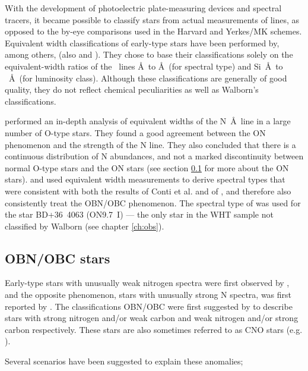 With the development of photoelectric plate-measuring devices and
spectral tracers, it became possible to classify stars from actual
measurements of lines, as opposed to the by-eye comparisons used in
the Harvard and Yerkes/MK schemes. Equivalent width classifications
of early-type stars have been performed by, among others,
 (also \cite{co:v} and \cite{co:vi}). They chose to base
their classifications solely on the equivalent-width ratios of the
\hei\ lines \AA\ to \AA\ (for spectral type) and
Si~\AA\ to
\hei~\AA\ (for luminosity class). Although these
classifications are generally of good quality, they do not reflect
chemical peculiarities as well as Walborn's classifications.

 performed an in-depth analysis of equivalent widths of
the N~\AA\ line in a large number of O-type stars. They
found a good agreement between the ON phenomenon and the strength of
the N line. They also concluded that there is a continuous
distribution of N abundances, and not a marked discontinuity between
normal O-type stars and the ON stars (see section \ref{sec:intro_obn}
for more about the ON stars).  and
 used equivalent width measurements to derive spectral
types that were consistent with both the results of Conti et al. and
of , and therefore also consistently treat the OBN/OBC
phenomenon. The spectral type of
 was used for the star BD+36~4063 (ON9.7~I) --- the only
star in the WHT sample not classified by Walborn (see chapter \ref{ch:obs}).

\subsection{OBN/OBC stars}
\label{sec:intro_obn}
Early-type stars with unusually weak nitrogen spectra were first observed by
, and the opposite phenomenon, stars with unusually strong
N spectra, was first reported by . The classifications
OBN/OBC were first suggested by  to describe stars with
strong nitrogen and/or weak carbon and weak nitrogen and/or strong
carbon respectively. These stars are also sometimes referred to as CNO
stars (e.g. \cite{jaja:74}).

Several scenarios have been suggested to explain these anomalies;

